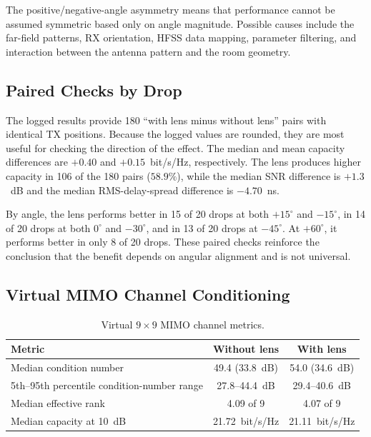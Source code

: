 \documentclass[10pt]{article}
\begin{document}
The positive/negative-angle asymmetry means that performance cannot be
assumed symmetric based only on angle magnitude. Possible causes include the
far-field patterns, RX orientation, HFSS data mapping, parameter filtering,
and interaction between the antenna pattern and the room geometry.

\subsection{Paired Checks by Drop}

The logged results provide 180 ``with lens minus without lens'' pairs with
identical TX positions. Because the logged values are rounded, they are most
useful for checking the direction of the effect. The median and mean capacity
differences are $+0.40$ and $+0.15$~bit/s/Hz, respectively. The lens produces
higher capacity in 106 of the 180 pairs ($58.9\%$), while the median SNR
difference is $+1.3$~dB and the median RMS-delay-spread difference is
$-4.70$~ns.

By angle, the lens performs better in 15 of 20 drops at both $+15^\circ$ and
$-15^\circ$, in 14 of 20 drops at both $0^\circ$ and $-30^\circ$, and in 13
of 20 drops at $-45^\circ$. At $+60^\circ$, it performs better in only 8 of
20 drops. These paired checks reinforce the conclusion that the benefit
depends on angular alignment and is not universal.

\subsection{Virtual MIMO Channel Conditioning}

\begin{table}[H]
    \centering
    \caption{Virtual $9\times9$ MIMO channel metrics.}
    \label{tab:monte_carlo_virtual_mimo}
    \small
    \begin{tabular}{lcc}
        \hline
        \textbf{Metric} & \textbf{Without lens} & \textbf{With lens} \\
        \hline
        Median condition number & 49.4 (33.8~dB) & 54.0 (34.6~dB) \\
        5th--95th percentile condition-number range & 27.8--44.4~dB &
        29.4--40.6~dB \\
        Median effective rank & 4.09 of 9 & 4.07 of 9 \\
        Median capacity at 10~dB & 21.72~bit/s/Hz & 21.11~bit/s/Hz \\
        \hline
    \end{tabular}
\end{table}
\end{document}
